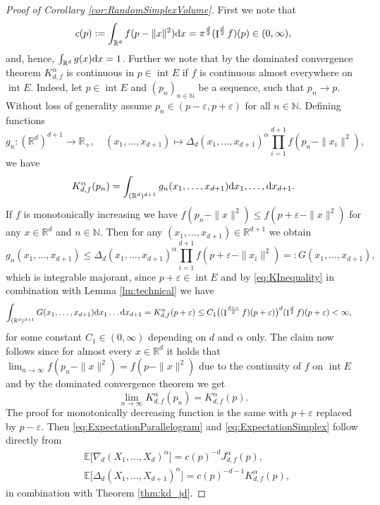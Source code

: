 \documentclass[11pt,a4paper]{article}
\theoremstyle{plain}
\theoremstyle{definition}
\theoremstyle{remark}
\def\EE{\mathbb{E}}
\def\NN{\mathbb{N}}
\def\RR{\mathbb{R}}
\newcommand{\dd}{{\rm d}}
\newcommand{\frI}{\mathop{\mathrm{I}}\nolimits}
\newcommand{\inter}{\operatorname{int}}
\newcommand{\dint}{\textup{d}}
\begin{document}
\begin{proof}[Proof of Corollary \ref{cor:RandomSimplexVolume}]
    First we note that 
    \[
        c(p):=\int_{\RR^d}f(p-\|x\|^2)\dd x
        =\pi^{d\over 2}(\frI^{d\over 2}f)(p)\in (0,\infty),
    \]
    and, hence, $\int_{\RR^d}g(x)\dint x=1$. Further we note that by the dominated convergence theorem $K_{d,f}^{\alpha}$ is continuous in $p\in\inter E$ if $f$ is continuous almost everywhere on $\inter E$. Indeed, let $p\in\inter E$ and $(p_n)_{n\in\NN}$ be a sequence, such that $p_n\to p$. Without loss of generality assume $p_n\in (p-\varepsilon,p+\varepsilon)$ for all $n\in \NN$. Defining functions
    \[
        g_n\colon(\RR^d)^{d+1}\to \RR_+, \quad (x_1,\ldots, x_{d+1})\mapsto\Delta_d(x_1,\ldots,x_{d+1})^\alpha \prod_{i=1}^{d+1}f(p_n-\|x_i\|^2),
    \]
    we have
     \[
        K_{d,f}^\alpha(p_n)=\int_{(\RR^d)^{d+1}} g_n(x_1,\ldots,x_{d+1})\dd x_1,\ldots,\dd x_{d+1}.
    \]
    If $f$ is monotonically increasing we have $f(p_n-\|x\|^2)\leq f(p+\varepsilon-\|x\|^2)$ for any $x\in\RR^d$ and $n\in\NN$. Then for any $(x_1,\ldots, x_{d+1})\in\RR^{d+1}$ we obtain 
    \[
        g_n(x_1,\ldots,x_{d+1})\leq \Delta_d(x_1,\ldots,x_{d+1})^\alpha \prod_{i=1}^{d+1}f(p+\varepsilon-\|x_i\|^2)=:G(x_1,\ldots,x_{d+1}),
    \]
    which is integrable majorant, since $p+\varepsilon\in\inter E$ and by \eqref{eq:KInequality} in combination with Lemma \ref{lm:technical} we have
    \begin{align*}
    \int_{(\RR^d)^{d+1}} G(x_1,\ldots,x_{d+1})\dd x_1\dots \dd x_{d+1}&=K_{d,f}^{\alpha}(p+\varepsilon)\leq C_1\big((\frI^{{d+\alpha\over 2}}f)(p+\varepsilon)\big)^{d}(\frI^{{d\over 2}}f)(p+\varepsilon)<\infty,
    \end{align*}
    for some constant $C_1\in (0,\infty)$ depending on $d$ and $\alpha$ only. The claim now follows since for almost every $x\in\RR^d$ it holds that $\lim_{n\to\infty}f(p_n-\|x\|^2)=f(p-\|x\|^2)$ due to the continuity of $f$ on $\inter E$ and by the dominated convergence theorem we get
    \[
        \lim_{n\to\infty}K^{\alpha}_{d,f}(p_n)=K^{\alpha}_{d,f}(p).
    \]
    The proof for monotonically decreasing function is the same with $p+\varepsilon$ replaced by $p-\varepsilon$.
    Then \eqref{eq:ExpectationParallelogram} and \eqref{eq:ExpectationSimplex} follow directly from
    \begin{align*}
        &\EE \big[\nabla_d(X_1,\ldots,X_{d})^{\alpha}\big]=c(p)^{-d}J_{d,f}^{\alpha}(p),\\
        &\EE \big[\Delta_d(X_1,\ldots,X_{d+1})^{\alpha}\big]=c(p)^{-d-1}K_{d,f}^{\alpha}(p),
    \end{align*}
    in combination with Theorem \ref{thm:kd_jd}.
    \end{proof}
\end{document}
